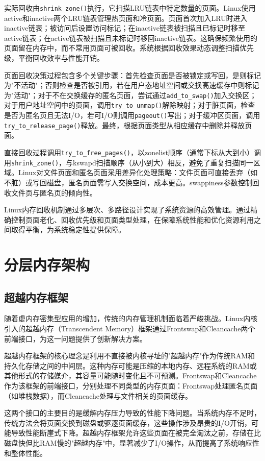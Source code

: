 实际回收由\texttt{shrink\_zone()}执行，它扫描LRU链表中特定数量的页面。Linux使用active和inactive两个LRU链表管理热页面和冷页面。页面首次加入LRU时进入inactive链表；被访问后设置访问标记；在inactive链表被扫描且已标记时移至active链表；在active链表被扫描且未标记时移回inactive链表。这确保频繁使用的页面留在内存中，而不常用页面可被回收。系统根据回收效果动态调整扫描优先级，平衡回收效率与性能开销。

页面回收决策过程包含多个关键步骤：首先检查页面是否被锁定或写回，是则标记为"不活动"；否则检查是否被引用，若在用户态地址空间或交换高速缓存中则标记为"活动"；对于不在交换缓存的匿名页面，尝试通过\texttt{add\_to\_swap()}加入交换区；对于用户地址空间中的页面，调用\texttt{try\_to\_unmap()}解除映射；对于脏页面，检查是否为匿名页且无法I/O，若可I/O则调用\texttt{pageout()}写出；对于缓冲区页面，调用\texttt{try\_to\_release\_page()}释放。最终，根据页面类型从相应缓存中删除并释放页面。

直接回收过程调用\texttt{try\_to\_free\_pages()}，以zonelist顺序（通常下标从大到小）调用\texttt{shrink\_zone()}，与kswapd扫描顺序（从小到大）相反，避免了重复扫描同一区域。Linux对文件页面和匿名页面采用差异化处理策略：文件页面可直接丢弃（如不脏）或写回磁盘，匿名页面需写入交换空间，成本更高。swappiness参数控制回收文件页与匿名页的倾向性。

Linux内存回收机制通过多层次、多路径设计实现了系统资源的高效管理。通过精确控制页面老化、回收优先级和页面类型处理，在保障系统性能和优化资源利用之间取得平衡，为系统稳定性提供保障。

\section{分层内存架构}

\subsection{超越内存框架}

随着虚内存密集型应用的增加，传统的内存管理机制面临着严峻挑战。Linux内核引入的超越内存（Transcendent Memory）框架通过Frontswap和Cleancache两个前端接口，为这一问题提供了创新解决方案。

超越内存框架的核心理念是利用不直接被内核寻址的"超越内存"作为传统RAM和持久化存储之间的中间层。这种内存可能是压缩的本地内存、远程系统的RAM或其他形式的存储媒介，其容量可能随时变化且不可预测。Frontswap和Cleancache作为该框架的前端接口，分别处理不同类型的内存页面：Frontswap处理匿名页面（如堆栈数据），而Cleancache处理与文件相关的页面缓存。

这两个接口的主要目的是缓解内存压力导致的性能下降问题。当系统内存不足时，传统方法会将页面交换到磁盘或驱逐页面缓存，这些操作涉及昂贵的I/O开销，可能导致性能断崖式下降。超越内存框架允许这些页面在被完全淘汰之前，存储在比磁盘快但比RAM慢的"超越内存"中，显著减少了I/O操作，从而提高了系统响应性和整体性能。

